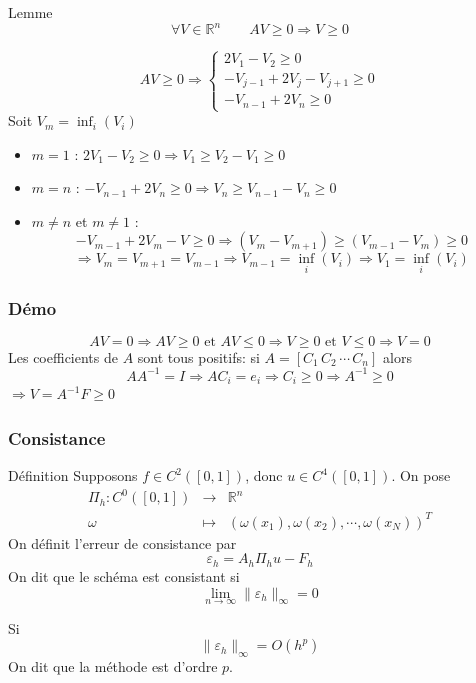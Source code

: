 \documentclass{beamer}
\begin{document}
 \begin{frame}

\begin{block}{Lemme}
\[\forall V \in \mathbb{R}^n\qquad AV\geq 0 \Longrightarrow V\geq 0\]
\end{block}
\[  AV\geq 0 \Longrightarrow
 \left\{
 \begin{array}{l}
2V_1-V_2\geq 0\\
-V_{j-1}+2V_j-V_{j+1}\geq 0\\
-V_{n-1}+2V_n\geq 0
\end{array}
\right.
 \]
Soit $V_m=\inf_i(V_i)$
\begin{itemize}
\item $m=1$ : $2V_1-V_2\geq 0 \Longrightarrow V_1\geq V_2-V_1\geq 0 $
\item $m=n$ : $-V_{n-1}+2V_n \geq 0 \Longrightarrow V_n\geq V_{n-1}-V_n\geq 0 $
\item $m\neq n$ et $m \neq 1$ : 
\[-V_{m-1}+2V_m-V_{
}\geq 0  \Longrightarrow (V_m-V_{m+1})\geq (V_{m-1}-V_m)\geq 0\]
\[ \Longrightarrow V_m=V_{m+1}=V_{m-1} \Longrightarrow V_{m-1}=\inf_i(V_i)\Longrightarrow V_1=\inf_i(V_i)\]
\end{itemize}


\end{frame}

\begin{frame}
  \frametitle{Démo}
  \[AV=0 \Longrightarrow AV\geq 0 \mbox { et } AV\leq 0\Longrightarrow V\geq 0 \mbox { et } V\leq 0\Longrightarrow V=0\]
  Les coefficients de $A$ sont tous positifs: si $A=[C_1\,C_2\,\cdots\,C_n]$ alors
  \[ A A^{-1}=I  \Longrightarrow A C_i =e_i \Longrightarrow C_i\geq 0 \Longrightarrow  A^{-1}\geq 0 \]
  $\Longrightarrow V = A^{-1}F\geq 0$
  
  
 \end{frame} 
  
  \begin{frame}
  \frametitle{Consistance}
  \begin{block}{Définition}
  Supposons $f\in C^2([0,1])$, donc $u\in C^4([0,1])$. On pose
  \[\begin{array}{ccc}
   \Pi_h:C^0([0,1])&\to &\mathbb{R}^n\\
  \omega&\mapsto &(\omega(x_1),\omega(x_2),\cdots,\omega(x_N))^T
  \end{array}\]
  On définit l'erreur de consistance par
  \[\varepsilon_h=A_h\Pi_h u-F_h\]
  On dit que le schéma est consistant si \[\lim_{n\to\infty}\|\varepsilon_h\|_{\infty}=0\]
  
  Si \[\|\varepsilon_h\|_{\infty} = O(h^p)\] On dit que la méthode est d'ordre $p$.
  \end{block}
  
 \end{frame} 
\end{document}
